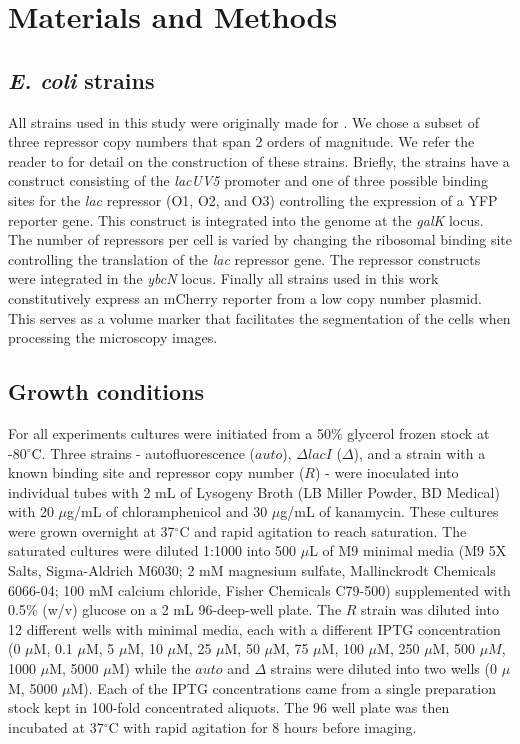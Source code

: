\section{Materials and Methods}

\subsection{\textit{E. coli} strains}

All strains used in this study were originally made for \cite{Razo-Mejia2018}.
We chose a subset of three repressor copy numbers that span 2 orders of
magnitude. We refer the reader to \cite{Razo-Mejia2018} for detail on the
construction of these strains. Briefly, the strains have a construct consisting
of the \textit{lacUV5} promoter and one of three possible binding sites for the
\textit{lac} repressor (O1, O2, and O3) controlling the expression of a YFP
reporter gene. This construct is integrated into the genome at the
\textit{galK} locus. The number of repressors per cell is varied by changing
the ribosomal binding site controlling the translation of the \textit{lac}
repressor gene. The repressor constructs were integrated in the \textit{ybcN}
locus. Finally all strains used in this work constitutively express an mCherry
reporter from a low copy number plasmid. This serves as a volume marker that
facilitates the segmentation of the cells when processing the microscopy
images.

\subsection{Growth conditions}

For all experiments cultures were initiated from a 50\% glycerol frozen stock
at -80$^\circ$C. Three strains - autofluorescence ($auto$), $\Delta lacI$
($\Delta$), and a strain with a known binding site and repressor copy number
($R$) - were inoculated into individual tubes with 2 mL of Lysogeny Broth (LB
Miller Powder, BD Medical) with 20 $\mu$g/mL of chloramphenicol and 30
$\mu$g/mL of kanamycin. These cultures were grown overnight at 37$^\circ$C and
rapid agitation to reach saturation. The saturated cultures were diluted 1:1000
into 500 $\mu$L of M9 minimal media (M9 5X Salts, Sigma-Aldrich M6030; 2 mM
magnesium sulfate, Mallinckrodt Chemicals 6066-04; 100 mM calcium chloride,
Fisher Chemicals C79-500) supplemented with 0.5\% (w/v) glucose on a 2 mL
96-deep-well plate. The $R$ strain was diluted into 12 different wells with
minimal media, each with a different IPTG  concentration (0 $\mu$M, 0.1 $\mu$M,
5 $\mu$M, 10 $\mu$M, 25 $\mu$M, 50 $\mu$M, 75 $\mu$M, 100 $\mu$M, 250 $\mu$M,
500 $\mu M$, 1000 $\mu$M, 5000 $\mu$M) while  the $auto$ and $\Delta$ strains
were diluted into two wells (0 $\mu$M, 5000 $\mu$M). Each of the IPTG
concentrations came from a single preparation stock kept in 100-fold
concentrated aliquots. The 96 well plate was then incubated at 37$^\circ$C with
rapid agitation for 8 hours before imaging.

